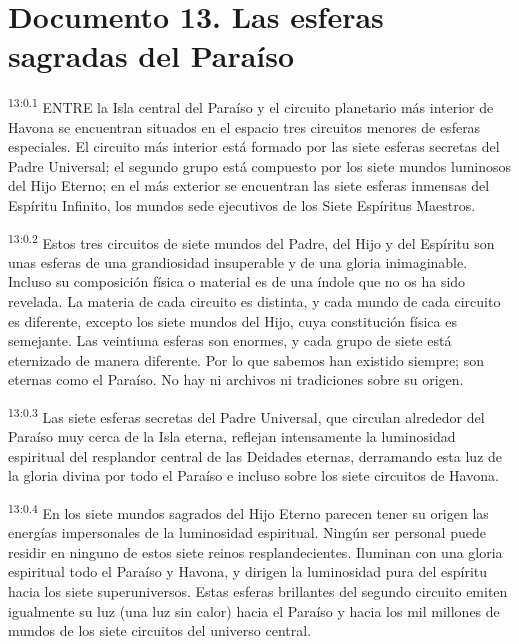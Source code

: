 \chapter{Documento 13. Las esferas sagradas del Paraíso}
\par
\textsuperscript{13:0.1} ENTRE la Isla central del Paraíso y el circuito planetario más interior de Havona se encuentran situados en el espacio tres circuitos menores de esferas especiales. El circuito más interior está formado por las siete esferas secretas del Padre Universal; el segundo grupo está compuesto por los siete mundos luminosos del Hijo Eterno; en el más exterior se encuentran las siete esferas inmensas del Espíritu Infinito, los mundos sede ejecutivos de los Siete Espíritus Maestros.

\par
\textsuperscript{13:0.2} Estos tres circuitos de siete mundos del Padre, del Hijo y del Espíritu son unas esferas de una grandiosidad insuperable y de una gloria inimaginable. Incluso su composición física o material es de una índole que no os ha sido revelada. La materia de cada circuito es distinta, y cada mundo de cada circuito es diferente, excepto los siete mundos del Hijo, cuya constitución física es semejante. Las veintiuna esferas son enormes, y cada grupo de siete está eternizado de manera diferente. Por lo que sabemos han existido siempre; son eternas como el Paraíso. No hay ni archivos ni tradiciones sobre su origen.

\par
\textsuperscript{13:0.3} Las siete esferas secretas del Padre Universal, que circulan alrededor del Paraíso muy cerca de la Isla eterna, reflejan intensamente la luminosidad espiritual del resplandor central de las Deidades eternas, derramando esta luz de la gloria divina por todo el Paraíso e incluso sobre los siete circuitos de Havona.

\par
\textsuperscript{13:0.4} En los siete mundos sagrados del Hijo Eterno parecen tener su origen las energías impersonales de la luminosidad espiritual. Ningún ser personal puede residir en ninguno de estos siete reinos resplandecientes. Iluminan con una gloria espiritual todo el Paraíso y Havona, y dirigen la luminosidad pura del espíritu hacia los siete superuniversos. Estas esferas brillantes del segundo circuito emiten igualmente su luz (una luz sin calor) hacia el Paraíso y hacia los mil millones de mundos de los siete circuitos del universo central.

